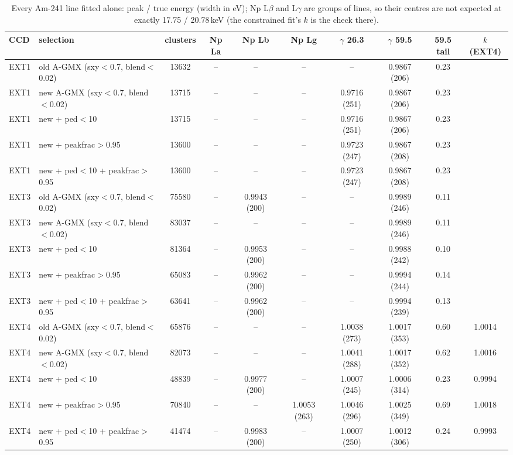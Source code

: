 \begin{table}[H]\centering\scriptsize
\begin{adjustbox}{max width=\linewidth}
\begin{tabular}{llcccccccc}
\toprule
CCD & selection & clusters & Np La & Np Lb & Np Lg & $\gamma$ 26.3 & $\gamma$ 59.5 & 59.5 tail & $k$ (EXT4) \\
\midrule
EXT1 & old A-GMX (sxy$<$0.7, blend$<$0.02) & 13632 & -- & -- & -- & -- & 0.9867 (206) & 0.23 &  \\
EXT1 & new A-GMX (sxy$<$0.7, blend$<$0.02) & 13715 & -- & -- & -- & 0.9716 (251) & 0.9867 (206) & 0.23 &  \\
EXT1 & new + ped$<$10 & 13715 & -- & -- & -- & 0.9716 (251) & 0.9867 (206) & 0.23 &  \\
EXT1 & new + peakfrac$>$0.95 & 13600 & -- & -- & -- & 0.9723 (247) & 0.9867 (208) & 0.23 &  \\
EXT1 & new + ped$<$10 + peakfrac$>$0.95 & 13600 & -- & -- & -- & 0.9723 (247) & 0.9867 (208) & 0.23 &  \\
\midrule
EXT3 & old A-GMX (sxy$<$0.7, blend$<$0.02) & 75580 & -- & 0.9943 (200) & -- & -- & 0.9989 (246) & 0.11 &  \\
EXT3 & new A-GMX (sxy$<$0.7, blend$<$0.02) & 83037 & -- & -- & -- & -- & 0.9989 (246) & 0.11 &  \\
EXT3 & new + ped$<$10 & 81364 & -- & 0.9953 (200) & -- & -- & 0.9988 (242) & 0.10 &  \\
EXT3 & new + peakfrac$>$0.95 & 65083 & -- & 0.9962 (200) & -- & -- & 0.9994 (244) & 0.14 &  \\
EXT3 & new + ped$<$10 + peakfrac$>$0.95 & 63641 & -- & 0.9962 (200) & -- & -- & 0.9994 (239) & 0.13 &  \\
\midrule
EXT4 & old A-GMX (sxy$<$0.7, blend$<$0.02) & 65876 & -- & -- & -- & 1.0038 (273) & 1.0017 (353) & 0.60 & 1.0014 \\
EXT4 & new A-GMX (sxy$<$0.7, blend$<$0.02) & 82073 & -- & -- & -- & 1.0041 (288) & 1.0017 (352) & 0.62 & 1.0016 \\
EXT4 & new + ped$<$10 & 48839 & -- & 0.9977 (200) & -- & 1.0007 (245) & 1.0006 (314) & 0.23 & 0.9994 \\
EXT4 & new + peakfrac$>$0.95 & 70840 & -- & -- & 1.0053 (263) & 1.0046 (296) & 1.0025 (349) & 0.69 & 1.0018 \\
EXT4 & new + ped$<$10 + peakfrac$>$0.95 & 41474 & -- & 0.9983 (200) & -- & 1.0007 (250) & 1.0012 (306) & 0.24 & 0.9993 \\
\bottomrule
\end{tabular}
\end{adjustbox}
\caption*{Every Am-241 line fitted alone: peak / true energy (width in eV); Np L$\beta$ and L$\gamma$ are groups of lines, so their centres are not expected at exactly 17.75 / 20.78\,keV (the constrained fit's $k$ is the check there).}
\end{table}
